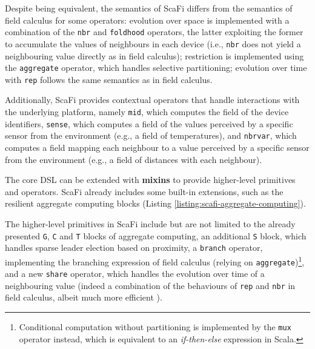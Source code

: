 Despite being equivalent, the semantics of \ac{ScaFi} differs from the
semantics of field calculus for some operators: evolution over space is
implemented with a combination of the \texttt{nbr} and \texttt{foldhood}
operators, the latter exploiting the former to accumulate the values of
neighbours in each device (i.e., \texttt{nbr} does not yield a neighbouring
value directly as in field calculus); restriction is implemented using the
\texttt{aggregate} operator, which handles selective partitioning; evolution
over time with \texttt{rep} follows the same semantics as in field calculus.

Additionally, \ac{ScaFi} provides contextual operators that handle interactions
with the underlying platform, namely \texttt{mid}, which computes the field of
the device identifiers, \texttt{sense}, which computes a field of the values
perceived by a specific sensor from the environment (e.g., a field of
temperatures), and \texttt{nbrvar}, which computes a field mapping each
neighbour to a value perceived by a specific sensor from the environment (e.g.,
a field of distances with each neighbour).

The core \ac{DSL} can be extended with \textbf{mixins} to provide higher-level
primitives and operators. \ac{ScaFi} already includes some built-in extensions,
such as the resilient aggregate computing blocks (Listing
\ref{listing:scafi-aggregate-computing}).



The higher-level primitives in \ac{ScaFi} include but are not limited to the
already presented \texttt{G}, \texttt{C} and \texttt{T} blocks of aggregate
computing, an additional \texttt{S} block, which handles sparse leader election
based on proximity, a \texttt{branch} operator, implementing the branching
expression of field calculus (relying on
\texttt{aggregate})\footnote{Conditional computation without partitioning is
implemented by the \texttt{mux} operator instead, which is equivalent to an
\textit{if-then-else} expression in Scala.}, and a new \texttt{share} operator,
which handles the evolution over time of a neighbouring value (indeed a
combination of the behaviours of \texttt{rep} and \texttt{nbr} in field
calculus, albeit much more efficient \cite{ScaFi-ShareOperator}).

